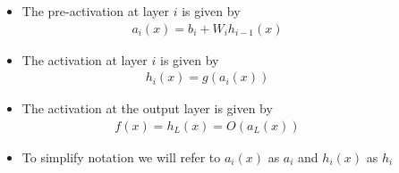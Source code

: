 \begin{frame}
  \begin{columns}
    \begin{overlayarea}{\textwidth}{\textheight}
      \makebox[\textwidth][c]{\usebox{\nncontent}}
    \end{overlayarea}

    \begin{overlayarea}{\textwidth}{\textheight}
      \begin{itemize}
        \justifying
        \item<1-> The pre-activation at layer $i$ is given by
          \begin{align*}
            a_i(x) = b_i + W_i h_{i-1}(x)
          \end{align*}
        \item<2-> The activation at layer $i$ is given by
          \begin{align*}
            h_i(x) = g(a_i(x))
          \end{align*}

        \item<4-> The activation at the output layer is given by
            \begin{align*}
              f(x) = h_{L}(x) = O(a_{L}(x))
            \end{align*}
        \item<6-> To simplify notation we will refer to $a_i(x)$ as $a_i$ and $h_i(x)$ as $h_i$
      \end{itemize}
    \end{overlayarea}
  \end{columns}
\end{frame}

